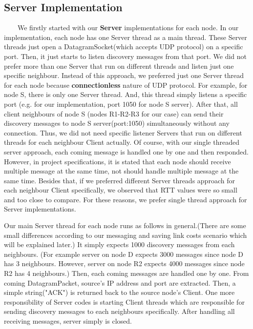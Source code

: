 \documentclass[12pt]{article}
\begin{document}
\subsection{Server Implementation}
\ \ \ \ We firstly started with our \textbf{Server} implementations for each node. In our implementation, each node has one Server thread as a main thread. These Server threads just open a DatagramSocket(which accepts UDP protocol) on a specific port. Then, it just starts to listen discovery messages from that port. We did not prefer more than one Server that run on different threads and listen just one specific neighbour. Instead of this approach, we preferred just one Server thread for each node because \textbf{connectionless} nature of UDP protocol. For example, for node S, there is only one Server thread. And, this thread simply listens a specific port (e.g. for our implementation, port 1050 for node S server). After that, all client neighbours of node S (nodes R1-R2-R3 for our case) can send their discovery messages to node S server(port:1050) simultaneously without any connection. Thus, we did not need specific listener Servers that run on different threads for each neighbour Client actually. Of course, with our single threaded server approach, each coming message is handled one by one and then responded. However, in project specifications, it is stated that each node should receive multiple message at the same time, not should handle multiple message at the same time. Besides that, if we preferred different Server threads approach for each neighbour Client specifically, we observed that RTT values were so small and too close to compare. For these reasons, we prefer single thread approach for Server implementations.

Our main Server thread for each node runs as follows in general.(There are some small differences according to our messaging and saving link costs scenario which will be explained later.) It simply expects 1000 discovery messages from each neighbours. (For example server on node D expects 3000 messages since node D has 3 neighbours. However, server on node R2 expects 4000 messages since node R2 has 4 neighbours.) Then, each coming messages are handled one by one. From coming DatagramPacket, source's IP address and port are extracted. Then, a simple string("ACK") is returned back to the source node's Client. One more responsibility of Server codes is starting Client threads which are responsible for sending discovery messages to each neighbours specifically. After handling all receiving messages, server simply is closed.  
\end{document}
